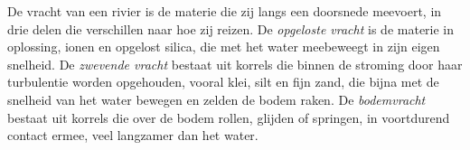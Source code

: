 \begin{definition}\label{def:b1:erosion-transport:load}
De vracht van een rivier is de materie die zij langs een doorsnede meevoert, in drie delen die verschillen naar hoe zij reizen. De \emph{opgeloste vracht} is de materie in oplossing, ionen en opgelost silica, die met het water meebeweegt in zijn eigen snelheid. De \emph{zwevende vracht} bestaat uit korrels die binnen de stroming door haar turbulentie worden opgehouden, vooral klei, silt en fijn zand, die bijna met de snelheid van het water bewegen en zelden de bodem raken. De \emph{bodemvracht} bestaat uit korrels die over de bodem rollen, glijden of springen, in voortdurend contact ermee, veel langzamer dan het water.
\end{definition}


